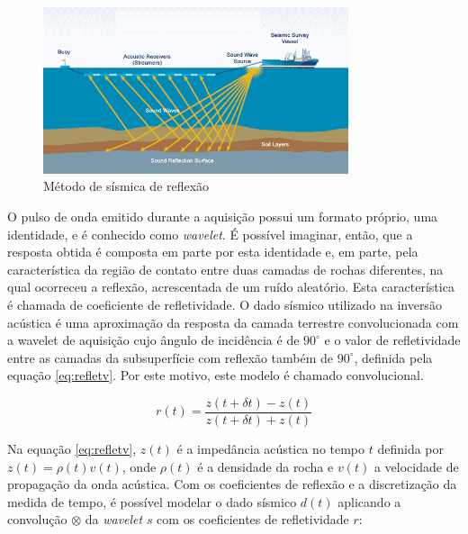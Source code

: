 \begin{figure}[ht!]
\begin{center}
  \includegraphics[width=0.8\textwidth]{fig/seismic_survey}
  \caption{Método de sísmica de reflexão \citep{figsismica}}
  \label{fig:1sismica}
\end{center}
\end{figure}

O pulso de onda emitido durante a aquisição possui um formato próprio, uma identidade, e
é conhecido como \textit{wavelet}. É possível imaginar, então, que a resposta obtida
é composta em parte por esta identidade e, em parte, pela característica da região de contato
entre duas camadas de rochas diferentes, na qual ocorreceu a reflexão, acrescentada de um ruído aleatório. Esta característica
é chamada de coeficiente de refletividade.
O dado sísmico utilizado na inversão acústica é uma aproximação da resposta da camada terrestre convolucionada com
a wavelet de aquisição cujo ângulo de incidência é de $90^\circ$ e o valor de refletividade entre as camadas da subsuperfície
com reflexão também de $90^\circ$, definida pela equação \ref{eq:refletv}. Por este motivo, este modelo é chamado convolucional.

\begin{equation}
r(t) = \frac{z(t+\delta t)-z(t)}{z(t+\delta t)+z(t)}
\label{eq:refletv}
\end{equation}

Na equação \ref{eq:refletv}, $z(t)$ é a impedância acústica no tempo $t$ definida por
$z(t)=\rho(t)v(t)$, onde $\rho(t)$ é a densidade da rocha e $v(t)$ a
velocidade de propagação da onda acústica. Com os coeficientes de
reflexão e a discretização da medida de tempo, é possível
modelar o dado sísmico $d(t)$ aplicando a convolução $\otimes$
da \textit{wavelet} $s$ com os coeficientes de refletividade $r$:

